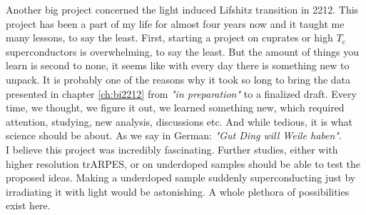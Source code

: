 \newpage

Another big project concerned the light induced Lifshitz transition in 2212.
This project has been a part of my life for almost four years now and it taught me many lessons, to say the least.
First, starting a project on cuprates or high $T_c$ superconductors is overwhelming, to say the least.
But the amount of things you learn is second to none, it seems like with every day there is something new to unpack.
It is probably one of the reasons why it took so long to bring the data presented in chapter \ref{ch:bi2212} from \textit{"in preparation"} to a finalized draft.
Every time, we thought, we figure it out, we learned something new, which required attention, studying, new analysis, discussions etc.
And while tedious, it is what science should be about.
As we say in German: \textit{"Gut Ding will Weile haben"}.\\
I believe this project was incredibly fascinating.
Further studies, either with higher resolution trARPES, or on underdoped samples should be able to test the proposed ideas.
Making a underdoped sample suddenly superconducting just by irradiating it with light would be astonishing.
A whole plethora of possibilities exist here.\hfill\break

